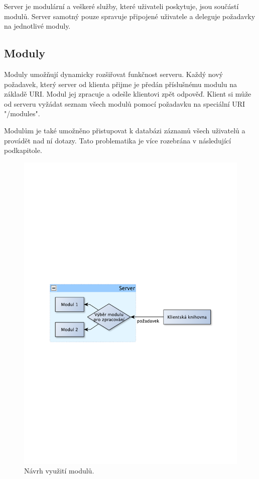 Server je modulární a veškeré služby, které uživateli poskytuje, jsou součástí modulů. Server samotný pouze spravuje
připojené uživatele a deleguje požadavky na jednotlivé moduly.

\subsection{Moduly}
\label{navrh_moduly}

Moduly umožňují dynamicky rozšiřovat funkčnost serveru. Každý nový požadavek, který server od klienta přijme je
předán příslušnému modulu na základě URI. Modul jej zpracuje a odešle klientovi zpět odpověď. Klient si může
od serveru vyžádat seznam všech modulů pomocí požadavku na speciální URI "/modules".

Modulům je také umožněno přistupovat k databázi záznamů všech uživatelů a provádět nad ní dotazy. Tato problematika je více
rozebrána v následující podkapitole.

\begin{figure}[h]
\centering
\includegraphics[trim=11cm 11cm 11cm 11cm, scale=0.7]{fig/navrh_moduly}
\caption{Návrh využití modulů.}
\label{fig:FigureExample}
\end{figure}

